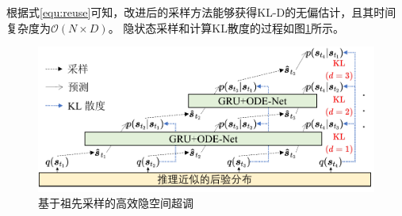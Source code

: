 根据式\eqref{equ:reuse}可知，改进后的采样方法能够获得KL-D的无偏估计，且其时间复杂度为$\mathcal{O}(N\times D)$。
隐状态采样和计算KL散度的过程如图\ref{fig:overshooting}所示。
\begin{figure}[ht]
    \centering
    \includegraphics[width=0.9\linewidth]{figures/chapter5/overshooting.pdf}
    \caption{基于祖先采样的高效隐空间超调}
    \label{fig:overshooting}
\end{figure}
